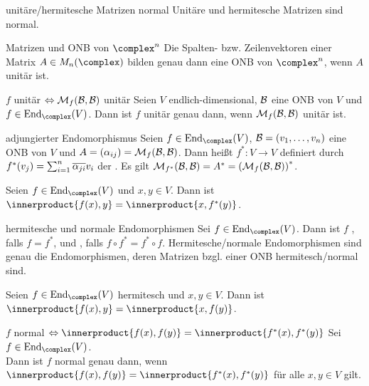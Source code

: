 \begin{Lemma}{unitäre/hermitesche Matrizen normal}
    Unitäre und hermitesche Matrizen sind normal.
\end{Lemma}

\begin{Satz}{Matrizen und ONB von $\complex^n$}
    Die Spalten- bzw. Zeilenvektoren einer Matrix $A \in M_n(\complex)$ bilden
    genau dann eine ONB von $\complex^n$, wenn $A$ unitär ist.
\end{Satz}

\begin{Satz}{$f$ unitär $\Leftrightarrow \mathcal{M}_{f}(\mathcal{B},\mathcal{B})$ unitär}
    Seien $V$ endlich-dimensional, $\mathcal{B}$ eine ONB von $V$ und \\
    $f \in \End_\complex(V)$.
    Dann ist $f$ unitär genau dann, wenn $\mathcal{M}_{f}(\mathcal{B},\mathcal{B})$ unitär ist.
\end{Satz}

\begin{Def}{adjungierter Endomorphismus}
    Seien $f \in \End_\complex(V)$, $\mathcal{B} = (v_1, \ldots, v_n)$ eine
    ONB von $V$ und $A = (\alpha_{ij}) = \mathcal{M}_{f}(\mathcal{B},\mathcal{B})$.
    Dann heißt $f^\ast: V \rightarrow V$ definiert durch
    $f^\ast(v_j) = \sum_{i=1}^n \overline{\alpha_{ji}} v_i$ der
    .
    Es gilt $\mathcal{M}_{f^\ast}(\mathcal{B},\mathcal{B}) = A^\ast =
    \left(\mathcal{M}_{f}(\mathcal{B},\mathcal{B})\right)^\ast$.
\end{Def}

\begin{Kor}
    Seien $f \in \End_\complex(V)$ und $x, y \in V$.
    Dann ist $\innerproduct{f(x), y} = \innerproduct{x, f^\ast(y)}$.
\end{Kor}

\begin{Def}{hermitesche und normale Endomorphismen}
    Sei $f \in \End_\complex(V)$.
    Dann ist $f$ , falls $f = f^\ast$,
    und , falls $f \circ f^\ast = f^\ast \circ f$.
    Hermitesche/normale Endomorphismen sind genau die Endomorphismen, deren
    Matrizen bzgl. einer ONB hermitesch/normal sind.
\end{Def}

\begin{Kor}
    Seien $f \in \End_\complex(V)$ hermitesch und $x, y \in V$.
    Dann ist $\innerproduct{f(x), y} = \innerproduct{x, f(y)}$.
\end{Kor}

\begin{Satz}%
{$f$ normal $\Leftrightarrow \innerproduct{f(x), f(y)} = \innerproduct{f^\ast(x), f^\ast(y)}$}
    Sei $f \in \End_\complex(V)$. \\
    Dann ist $f$ normal genau dann, wenn
    $\innerproduct{f(x), f(y)} = \innerproduct{f^\ast(x), f^\ast(y)}$ für alle $x, y \in V$ gilt.
\end{Satz}

